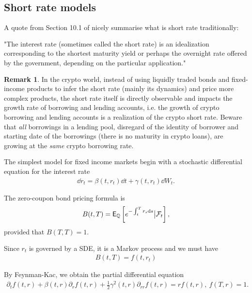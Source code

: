 \documentclass[square]{article} %
\theoremstyle{plain}
\theoremstyle{definition} %
\newtheorem{remark}[theorem]{Remark}
\begin{document}
\subsection{Short rate models}
A quote from Section 10.1 of \cite{Shreve2004a} nicely summarise what is short rate traditionally:
\begin{displayquote}
  "The interest rate (sometimes called the short rate) is an {\color{red} idealization} corresponding to the shortest maturity yield or perhaps the overnight rate offered by the government, depending on the particular application."
\end{displayquote}

\begin{remark}In the crypto world, instead of using liquidly traded bonds and fixed-income products to infer the short rate (mainly its dynamics) and price more complex products,
 the short rate itself is directly observable and impacts the growth rate of borrowing and lending accounts,
 i.e. the growth of crypto borrowing and lending accounts is a {\color{red} realization} of the crypto short rate.
 Beware that {\it all} borrowings in a lending pool, disregard of the identity of borrower and starting date of the borrowings (there is no maturity in crypto loans),
 are growing at the {\it{same}} crypto borrowing rate. \end{remark}

The simplest model for fixed income markets begin with a stochastic differential equation for the interest rate
\begin{align*}
  \dd r_t = \beta(t, r_t)\dd t + \gamma(t, r_t)\dd W_t.
\end{align*}

The zero-coupon bond pricing formula is
\begin{align*}
B(t,T) = {\mathbb{\sf E}}_\mathbb{Q}\left[
e^{-\int_t^T r_s {\rm d} s}\big|\mathcal{F}_t
\right],
\end{align*}
provided that $B(T,T)=1$. 

Since $r_t$ is governed by a SDE, it is a Markov process and we must have
\begin{align*}
B(t,T) = f(t, r_t)
\end{align*}

By Feynman-Kac, we obtain the partial differential equation
\begin{align*}
\partial_t f(t,r) + \beta(t,r)\partial_r f(t,r)+ \frac{1}{2}\gamma^2(t,r)\partial_{rr}f(t,r) = r f(t,r),\  
f(T, r)=1.
\end{align*}
\end{document}
